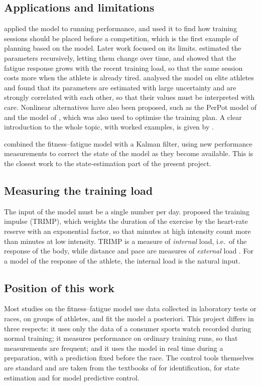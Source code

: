 \subsection{Applications and limitations}
\citet{morton1990} applied the model to running performance, and
\citet{fitzclarke1991} used it to find how training sessions should be placed
before a competition, which is the first example of planning based on the
model. Later work focused on its limits. \citet{busso1997} estimated the
parameters recursively, letting them change over time, and \citet{busso2003}
showed that the fatigue response grows with the recent training load, so that
the same session costs more when the athlete is already tired.
\citet{hellard2006} analysed the model on elite athletes and found that its
parameters are estimated with large uncertainty and are strongly correlated
with each other, so that their values must be interpreted with care. Nonlinear
alternatives have also been proposed, such as the PerPot model of
\citet{perl2001} and the model of \citet{turner2017}, which was also used to
optimise the training plan. A clear introduction to the whole topic, with
worked examples, is given by \citet{clarke2013}.

\citet{kolossa2017} combined the fitness--fatigue model with a Kalman filter,
using new performance measurements to correct the state of the model as they
become available. This is the closest work to the state-estimation part of the
present project.

\subsection{Measuring the training load}
The input of the model must be a single number per day. \citet{banister1991}
proposed the training impulse (TRIMP), which weights the duration of the
exercise by the heart-rate reserve with an exponential factor, so that minutes
at high intensity count more than minutes at low intensity. TRIMP is a
measure of \emph{internal} load, i.e.\ of the response of the body, while
distance and pace are measures of \emph{external} load \citep{impellizzeri2019}.
For a model of the response of the athlete, the internal load is the natural
input.

\subsection{Position of this work}
Most studies on the fitness--fatigue model use data collected in laboratory
tests or races, on groups of athletes, and fit the model a posteriori. This
project differs in three respects: it uses only the data of a consumer
sports watch recorded during normal training; it measures performance on
ordinary training runs, so that measurements are frequent; and it uses the
model in real time during a preparation, with a prediction fixed before the
race. The control tools themselves are standard and are taken from the
textbooks of \citet{ljung1999} for identification, \citet{simon2006} for
state estimation and \citet{rawlings2017} for model predictive control.

